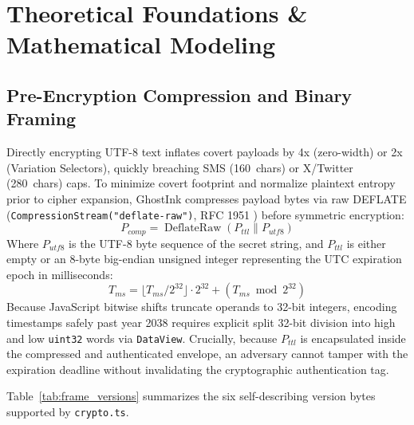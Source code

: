 \documentclass[12pt,a4paper,oneside,openany]{report}
\begin{document}
\chapter{Theoretical Foundations \& Mathematical Modeling}

\section{Pre-Encryption Compression and Binary Framing}
Directly encrypting UTF-8 text inflates covert payloads by 4x (zero-width) or 2x (Variation Selectors), quickly breaching SMS (160~chars) or X/Twitter (280~chars) caps. To minimize covert footprint and normalize plaintext entropy prior to cipher expansion, GhostInk compresses payload bytes via raw DEFLATE (\texttt{CompressionStream("deflate-raw")}, RFC 1951 \cite{rfc1951}) before symmetric encryption:
\begin{equation}
    P_{comp} = \operatorname{DeflateRaw}\left( P_{ttl} \parallel P_{utf8} \right)
\end{equation}
Where $P_{utf8}$ is the UTF-8 byte sequence of the secret string, and $P_{ttl}$ is either empty or an $8$-byte big-endian unsigned integer representing the UTC expiration epoch in milliseconds:
\begin{equation}
    T_{ms} = \lfloor T_{ms} / 2^{32} \rfloor \cdot 2^{32} + (T_{ms} \bmod 2^{32})
\end{equation}
Because JavaScript bitwise shifts truncate operands to 32-bit integers, encoding timestamps safely past year 2038 requires explicit split 32-bit division into high and low \texttt{uint32} words via \texttt{DataView}. Crucially, because $P_{ttl}$ is encapsulated inside the compressed and authenticated envelope, an adversary cannot tamper with the expiration deadline without invalidating the cryptographic authentication tag.

Table~\ref{tab:frame_versions} summarizes the six self-describing version bytes supported by \texttt{crypto.ts}.
\end{document}
